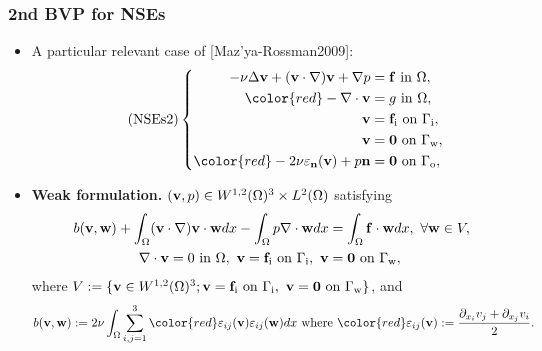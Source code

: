 \documentclass[t,xcolor=table,english]{beamer}   %
\begin{document}
\begin{frame}
	\frametitle{2nd BVP for NSEs}
	\begin{itemize}
		\item A particular relevant case of [Maz'ya-Rossman2009]:
		\begin{equation}
		\label{NSEs mixed BCs}
		\tag{NSEs2}
		\left\{\begin{split}
		- \nu\Delta{\bf v} + ({\bf v}\cdot\nabla){\bf v} + \nabla p &= {\bf f} \mbox{ in } \Omega,\\
		{\color{red}-\nabla\cdot{\bf v}} &= g \mbox{ in } \Omega,\\
		{\bf v} &= {\bf f}_{\rm i} \mbox{ on } \Gamma_{\rm i},\\
		{\bf v} &= {\bf 0} \mbox{ on } \Gamma_{\rm w},\\
		{\color{red}-2\nu\varepsilon_{\bf n}({\bf v}) + p{\bf n}} &= {\bf 0} \mbox{ on } \Gamma_{\rm o},
		\end{split}\right.
		\end{equation}
		\item \textbf{Weak formulation.} $({\bf v},p)\in W^{1,2}(\Omega)^3\times L^2(\Omega)$ satisfying
		\begin{align*}
		b({\bf v},{\bf w}) + \int_\Omega ({\bf v}\cdot\nabla){\bf v}\cdot{\bf w}dx - \int_\Omega p\nabla\cdot{\bf w}dx &= \int_\Omega {\bf f}\cdot{\bf w}dx,\ \forall {\bf w}\in V,\\
		\nabla\cdot{\bf v} = 0 \mbox{ in } \Omega,\ {\bf v} = {\bf f}_{\rm i} \mbox{ on } \Gamma_{\rm i},\ {\bf v} &= {\bf 0} \mbox{ on } \Gamma_{\rm w},
		\end{align*}
		where $V := \{{\bf v}\in W^{1,2}(\Omega)^3;{\bf v} = {\bf f}_{\rm i} \mbox{ on } \Gamma_{\rm i},\ {\bf v} = {\bf 0} \mbox{ on } \Gamma_{\rm w}\}$, and
		\begin{align*}
		b({\bf v},{\bf w}) := 2\nu\int_\Omega \sum_{i,j = 1}^3 {\color {red}\varepsilon_{ij}({\bf v})\varepsilon_{ij}({\bf w})}dx \mbox{ where } {\color{red}\varepsilon_{ij}({\bf v}) := \frac{\partial_{x_i}v_j + \partial_{x_j}v_i}{2}}.
		\end{align*}
	\end{itemize}	
\end{frame}
\end{document}
